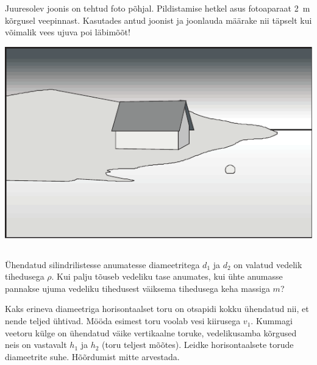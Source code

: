 \documentclass[10pt, twoside]{article}
\begin{document}
{%

Juuresolev joonis on tehtud foto põhjal. Pildistamise hetkel asus fotoaparaat \SI{2}{m} kõrgusel veepinnast. Kasutades antud joonist ja joonlauda määrake nii täpselt kui võimalik vees ujuva poi läbimõõt!

\begin{center}
	\includegraphics[width=0.9\linewidth]{2008-lahg-09-yl}
\end{center}
\probend
\bigskip
\newpage\subsection{\protect{}}


Ühendatud silindrilistesse anumatesse diameetritega $d_1$ ja $d_2$ on valatud vedelik tihedusega $\rho$. Kui palju tõuseb vedeliku tase anumates, kui ühte anumasse pannakse ujuma vedeliku tihedusest väiksema tihedusega keha massiga $m$?
\probend
\bigskip


Kaks erineva diameetriga horisontaalset toru on otsapidi
kokku ühendatud nii, et nende teljed ühtivad. Mööda esimest toru voolab vesi
kiirusega $v_1$. Kummagi veetoru külge on ühendatud väike vertikaalne toruke,
vedelikusamba kõrgused neis on vastavalt $h_1$ ja $h_2$ (toru teljest mõõtes). Leidke
horisontaalsete torude diameetrite suhe. Hõõrdumist mitte arvestada. 

}
\end{document}
